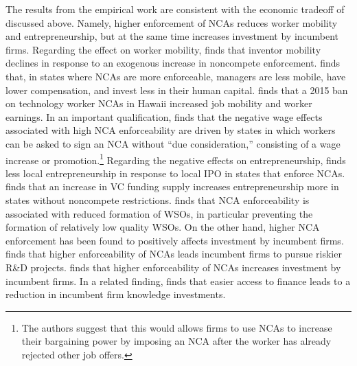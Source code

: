 \documentclass[ecta,nameyear,final]{econsocart}
\theoremstyle{plain}
\theoremstyle{remark}
\begin{document}
The results from the empirical work are consistent with the economic tradeoff of discussed above. Namely, higher enforcement of NCAs reduces worker mobility and entrepreneurship, but at the same time increases investment by incumbent firms. Regarding the effect on worker mobility, \cite{marx_mobility_2009} finds that inventor mobility declines in response to an exogenous increase in noncompete enforcement. \cite{garmaise_ties_2011} finds that, in states where NCAs are more enforceable, managers are less mobile, have lower compensation, and invest less in their human capital.  \cite{balasubramanian_locked_2020} finds that a 2015 ban on technology worker NCAs in Hawaii increased job mobility and worker earnings. In an important qualification, \cite{starr_consider_2018} finds that the negative wage effects associated with high NCA enforceability are driven by states in which workers can be asked to sign an NCA without ``due consideration,'' consisting of a wage increase or promotion.\footnote{The authors suggest that this would allows firms to use NCAs to increase their bargaining power by imposing an NCA after the worker has already rejected other job offers.} Regarding the negative effects on entrepreneurship, \cite{stuart_liquidity_2003} finds less local entrepreneurship in response to local IPO in states that enforce NCAs. \cite{samila_venture_2010} finds that an increase in VC funding supply increases entrepreneurship more in states without noncompete restrictions.  \cite{starr_screening_2018} finds that NCA enforceability is associated with reduced formation of WSOs, in particular preventing the formation of relatively low quality WSOs. On the other hand, higher NCA enforcement has been found to positively affects investment by incumbent firms. \cite{conti_non-competition_2014} finds that higher enforceability of NCAs leads incumbent firms to pursue riskier R\&D projects. \cite{jeffers_impact_2018} finds that higher enforceability of NCAs increases investment by incumbent firms. In a related finding, \cite{colombo_does_2013} finds that easier access to finance leads to a reduction in incumbent firm knowledge investments. 
\end{document}
